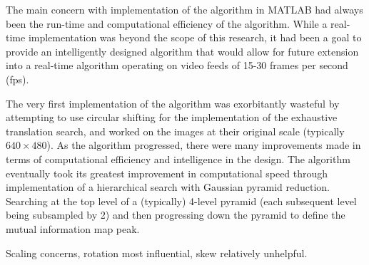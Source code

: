 %
%
%
%
%
%

%
%
%



The main concern with implementation of the algorithm in MATLAB\textsuperscript{\textregistered} had always been the run-time and computational efficiency of the algorithm. While a real-time implementation was beyond the scope of this research, it had been a goal to provide an intelligently designed algorithm that would allow for future extension into a real-time algorithm operating on video feeds of 15-30 frames per second (fps).

The very first implementation of the algorithm was exorbitantly wasteful by attempting to use circular shifting for the implementation of the exhaustive translation search, and worked on the images at their original scale (typically $640\times480$). As the algorithm progressed, there were many improvements made in terms of computational efficiency and intelligence in the design. The algorithm eventually took its greatest improvement in computational speed through implementation of a hierarchical search with Gaussian pyramid reduction. Searching at the top level of a (typically) 4-level pyramid (each subsequent level being subsampled by 2) and then progressing down the pyramid to define the mutual information map peak.

Scaling concerns, rotation most influential, skew relatively unhelpful.

